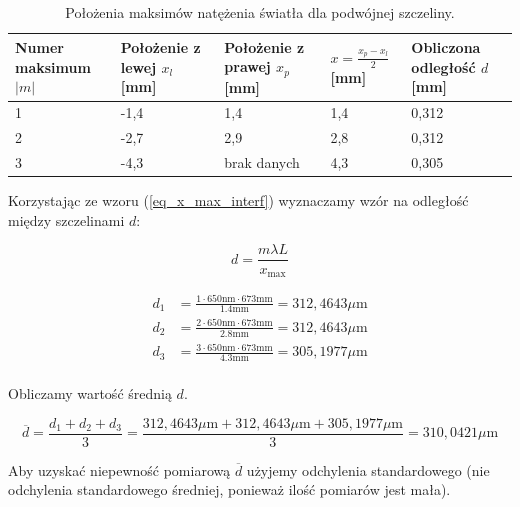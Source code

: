 \documentclass{fizykalab}
\newcommand{\nm}{\ensuremath{\text{nm}}}
\newcommand{\mm}{\ensuremath{\text{mm}}}
\newcommand{\um}{\ensuremath{\mu \text{m}}}
\begin{document}


\begin{table}[H]
    \centering
    \caption{Położenia maksimów  natężenia światła dla 
    podwójnej szczeliny.
    }
    \begin{tabular}{|C{2cm}|C{2cm} | C{2cm}| C{2cm} |C{2cm}|}
        \hline
         Numer maksimum $|m|$ &
         Położenie z lewej $x_l$ [mm]&
         Położenie z prawej $x_p$ [mm]& 
         $x = \frac{x_p - x_l}{2}$ [mm]& 
         Obliczona odległość $d$ [mm]
         \\  & -1,4 & 1,4 & 1,4 & 0,312  \\  & -2,7 & 2,9 & 2,8 & 0,312 \\  & -4,3 & brak danych & 4,3 & 0,305 \\ \hline
    \end{tabular}
    \label{tab:my_label}
\end{table}

Korzystając ze wzoru (\ref{eq_x_max_interf}) wyznaczamy wzór na 
odległość między szczelinami $d$:

\begin{equation}
    d = \frac{m \lambda L} {x_\text{max}}
\end{equation}

\begin{align*}
    d_1 &= \frac{1 \cdot 650 \nm  \cdot 673 \mm}{1.4 \mm} = 312,4643 \um \\
    d_2 &= \frac{2 \cdot 650 \nm  \cdot 673 \mm}{2.8 \mm} = 312,4643 \um \\
    d_3 &= \frac{3 \cdot 650 \nm  \cdot 673 \mm}{4.3 \mm} = 305,1977 \um \\
\end{align*}

 
Obliczamy wartość średnią $d$.

\begin{equation*}
    \overline{d} = \frac{d_1 + d_2 + d_3}{3} = \frac{312,4643 \um +  312,4643 \um +  305,1977 \um}{3} = 310,0421 \um
\end{equation*} 

Aby uzyskać niepewność pomiarową $\overline{d}$ użyjemy odchylenia standardowego
(nie odchylenia standardowego średniej, ponieważ ilość pomiarów jest mała).
\end{document}
